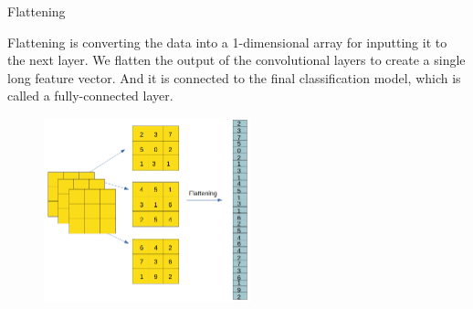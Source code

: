 \begin{vbframe}{Flattening}
    
Flattening is converting the data into a 1-dimensional array for inputting it to the next layer. We flatten the output of the convolutional layers to create a single long feature vector. And it is connected to the final classification model, which is called a fully-connected layer.
          
\begin{figure}
\centering
\includegraphics[width=6cm]{figure/flatten.png}
\end{figure}

\end{vbframe}



